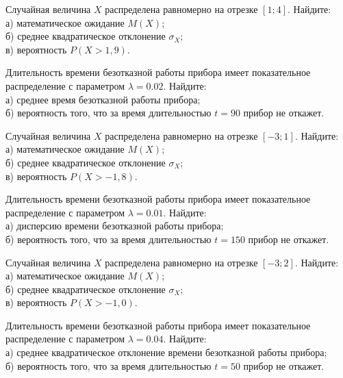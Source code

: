 \vfill

\newpage\setcounter{zad}{0}

\z Случайная величина $X$ распределена равномерно на отрезке $[1; 4]$. Найдите: \\ \quad а) математическое ожидание $M(X)$; \\ \quad б) среднее квадратическое отклонение $\sigma_X$; \\ \quad в) вероятность $P(X>1{,}9)$.


\vfill

\z Длительность времени безотказной работы прибора имеет показательное распределение с параметром $\lambda = 0.02$. Найдите: \\ \quad а) среднее время безотказной работы прибора; \\ \quad б) вероятность того, что за время длительностью $t = 90$ прибор не откажет.
 

\vfill

\newpage\setcounter{zad}{0}

\z Случайная величина $X$ распределена равномерно на отрезке $[-3; 1]$. Найдите: \\ \quad а) математическое ожидание $M(X)$; \\ \quad б) среднее квадратическое отклонение $\sigma_X$; \\ \quad в) вероятность $P(X>-1{,}8)$.


\vfill

\z Длительность времени безотказной работы прибора имеет показательное распределение с параметром $\lambda = 0.01$. Найдите: \\ \quad а) дисперсию времени безотказной работы прибора; \\ \quad б) вероятность того, что за время длительностью $t = 150$ прибор не откажет.
 

\vfill

\newpage\setcounter{zad}{0}

\z Случайная величина $X$ распределена равномерно на отрезке $[-3; 2]$. Найдите: \\ \quad а) математическое ожидание $M(X)$; \\ \quad б) среднее квадратическое отклонение $\sigma_X$; \\ \quad в) вероятность $P(X>-1{,}0)$.


\vfill

\z Длительность времени безотказной работы прибора имеет показательное распределение с параметром $\lambda = 0.04$. Найдите: \\ \quad а) среднее квадратическое отклонение времени безотказной работы прибора; \\ \quad б) вероятность того, что за время длительностью $t = 50$ прибор не откажет.
 

